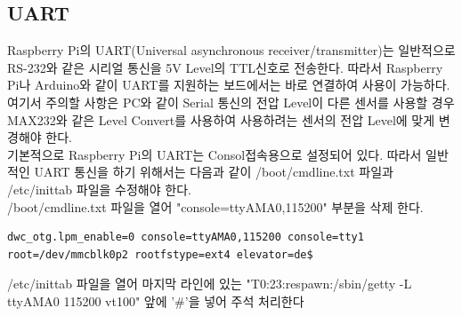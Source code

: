 \documentclass[11pt
  , a4paper
  , article
  , oneside
]{memoir}
\begin{document}
\subsection{UART}\label{subsec:uartConfig}
Raspberry Pi의 UART(Universal asynchronous receiver/transmitter)는 일반적으로 RS-232와 같은 
시리얼 통신을 5V Level의 TTL신호로 전송한다. 따라서 Raspberry Pi나 Arduino와 같이 UART를 지원하는 
보드에서는 바로 연결하여 사용이 가능하다. 여기서 주의할 사항은 PC와 같이 Serial 통신의 전압 Level이 다른
센서를 사용할 경우 MAX232와 같은 Level Convert를 사용하여 사용하려는 센서의 전압 Level에 맞게 변경해야 
한다.\\ 
기본적으로 Raspberry Pi의 UART는 Consol접속용으로 설정되어 있다. 따라서 일반적인 UART 통신을 하기 
위해서는 다음과 같이 /boot/cmdline.txt 파일과 /etc/inittab 파일을 수정해야 한다.\\
/boot/cmdline.txt 파일을 열어 "console=ttyAMA0,115200" 부분을 삭제 한다.
\begin{lstlisting}[style=termstyle]
dwc_otg.lpm_enable=0 console=ttyAMA0,115200 console=tty1 root=/dev/mmcblk0p2 rootfstype=ext4 elevator=de$
\end{lstlisting}
/etc/inittab 파일을 열어 마지막 라인에 있는 "T0:23:respawn:/sbin/getty -L ttyAMA0 115200 vt100"
앞에 '\#'을 넣어 주석 처리한다
\end{document}
